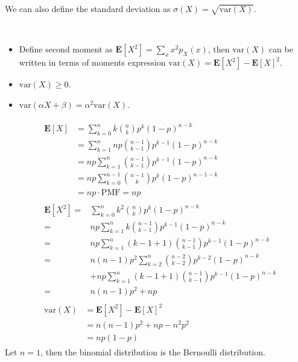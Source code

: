 We can also define the standard deviation as $\sigma(X) = \sqrt{\mathrm{var}(X)}$.
\begin{property} ~ 
    \begin{itemize}
        \item Define second moment as $\mathbf{E}[X^2] = \sum_x x^2 p_{X}(x)$, then $\mathrm{var}(X)$ can be written in terms of moments expression $\mathrm{var}(X) = \mathbf{E}[X^{2}] - \mathbf{E}[X]^{2}$.
        \item $\mathrm{var}(X) \geq 0$.
        \item $\mathrm{var}(\alpha X + \beta) = \alpha^{2} \mathrm{var}(X)$.
    \end{itemize}
\end{property}
\begin{example}
    \begin{align}
    &\begin{aligned}
        \mathbf{E}[X] &= \sum_{k=0}^{n} k \binom{n}{k} p^{k} (1-p)^{n-k} \\
                      &= \sum_{k=1}^{n} np \binom{n-1}{k-1} p^{k-1} (1-p)^{n-k} \\
                      &= np \sum_{k=1}^{n} \binom{n-1}{k-1} p^{k-1} (1-p)^{n-k} \\
                      &= np \sum_{k=0}^{n-1} \binom{n-1}{k} p^{k} (1-p)^{n-1-k} \\
                      &= np \cdot \mathrm{PMF} = np
    \end{aligned} \\
    &\begin{aligned}
        \mathbf{E}[X^{2}] =& \sum_{k=0}^{n} k^{2} \binom{n}{k} p^{k} (1-p)^{n-k} \\
                         =& np \sum_{k=1}^{n} k \binom{n-1}{k-1} p^{k-1} (1-p)^{n-k} \\
                         =& np \sum_{k=1}^{n} (k-1+1) \binom{n-1}{k-1} p^{k-1} (1-p)^{n-k} \\ 
                         =& n(n-1)p^2 \sum_{k=2}^{n} \binom{n-2}{k-2} p^{k-2} (1-p)^{n-k} \\ 
                         &+ np \sum_{k=1}^{n} (k-1+1) \binom{n-1}{k-1} p^{k-1} (1-p)^{n-k} \\ 
                         =& n(n-1)p^2 + np
    \end{aligned} \\
    &\begin{aligned}
        \mathrm{var}(X) &= \mathbf{E}[X^{2}] - \mathbf{E}[X]^{2} \\
                        &= n(n-1)p^2 + np - n^2p^2 \\
                        &= np(1-p)
    \end{aligned}
    \end{align}
    Let $n = 1$, then the binomial distribution is the Bernoulli distribution.
\end{example}

